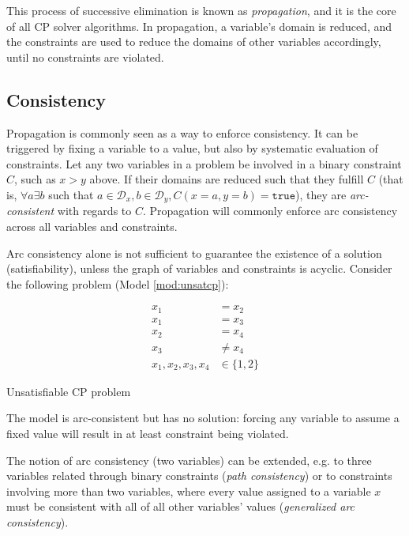 \documentclass[13pt, letterpaper, oneside]{book}
\begin{document}
This process of successive elimination is known as
\textit{propagation}, and it is the core of all CP solver algorithms. In
propagation, a variable's domain is reduced, and the constraints are used
to reduce the domains of other variables accordingly, until no constraints are
violated.

\subsection{Consistency}
Propagation is commonly seen as a way to enforce consistency. It can be
triggered by fixing a variable to a value, but also by systematic evaluation of
constraints. Let any two variables in a problem be involved in a binary
constraint $C$, such as $x > y$ above. If their domains are reduced such that
they fulfill $C$ (that is, $\forall a \exists b$ such that $a \in
\mathcal{D}_x, b \in \mathcal{D}_y, C(x = a, y = b) = \mathtt{true}$), they are
\textit{arc-consistent} with regards to $C$. Propagation will commonly enforce
arc consistency across all variables and constraints.
 
Arc consistency alone is not sufficient to guarantee the existence of a solution
(satisfiability), unless the graph of variables and constraints is acyclic.
Consider the following problem (Model \ref{mod:unsatcp}):
 
\begin{model}[h!]
\begin{align}
x_1 &= x_2\\
x_1 &= x_3\\
x_2 &= x_4\\
x_3 &\neq x_4\\
x_1, x_2, x_3, x_4 &\in \{1, 2\}
\end{align}
\caption{Unsatisfiable CP problem}
\label{mod:unsatcp}
\end{model}
The model is arc-consistent but has no solution: forcing any variable to assume
a fixed value will result in at least constraint being violated.
 
The notion of arc consistency (two variables) can be extended, e.g. to three
variables related through binary constraints (\textit{path consistency}) or
to constraints involving more than two variables, where every value assigned to
a variable $x$ must be consistent with all of all other variables' values
(\textit{generalized arc consistency}).
\end{document}
